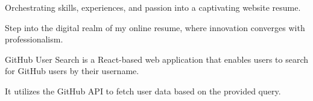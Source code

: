 \begin{minipage}[t]{0.66\textwidth}
\vspace{\topsep} 

\href{https://github.com/iamrudhresh/MyWebResume}{\bf {}}
\begin{tightemize}
\item Orchestrating skills, experiences, and passion into a captivating website resume.
\item Step into the digital realm of my online resume, where innovation converges with professionalism.
\end{tightemize}

\vspace{\topsep} 

\href{https://github.com/iamrudhresh/Github-User-Search}{\bf {}}
\begin{tightemize}
\item GitHub User Search is a React-based web application that enables users to search for GitHub users by their username. 
\item It utilizes the GitHub API to fetch user data based on the provided query.
\end{tightemize}


\sectionsep










\end{minipage}
